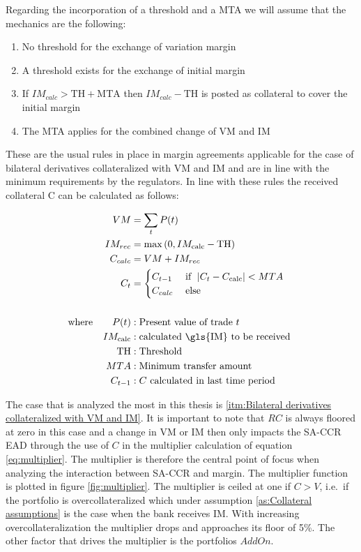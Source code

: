 \documentclass[../Thesis_AHoecherl.tex]{subfiles}
\begin{document}
Regarding the incorporation of a threshold and a MTA we will assume that the mechanics are the following:
\begin{enumerate}
	\item No threshold for the exchange of variation margin
	\item A threshold exists for the exchange of initial margin
	\item If $ IM_{calc} > \text{TH} + \text{MTA} $ then $IM_{calc} - \text{TH} $ is posted as collateral to cover the initial margin
	\item The MTA applies for the combined change of VM and IM
\end{enumerate}

These are the usual rules in place in margin agreements applicable for the case of bilateral derivatives collateralized with VM and IM and are in line with the minimum requirements by the regulators.
In line with these rules the received collateral C can be calculated as follows:

\begin{align*}
	VM &= \sum_t{P(t)} \\
	IM_{rec} &= \max{(0, IM_{\text{calc}}-\text{TH})}\\
	C_{calc} &= VM + IM_{rec}\\
	C_t &= \begin{cases}
		C_{t-1} & \text{if } \; |C_t-C_{\text{calc}}| < MTA\\
		C_{calc} \; &\text{else} 
	\end{cases}
	\\
	\\
	\text{where} \qquad P(t) &: \text{Present value of trade $t$} \\
	IM_{\text{calc}} &: \text{calculated \gls{IM} to be received } \\
	\text{TH} &: \text{Threshold} \\
	MTA &: \text{Minimum transfer amount} \\
	C_{t-1} &: \text{$C$ calculated in last time period}
\end{align*}

The case that is analyzed the most in this thesis is \ref{itm:Bilateral derivatives collateralized with VM and IM}. It is important to note that \(RC\) is always floored at zero in this case and a change in VM or IM then only impacts the \gls{SA-CCR} \gls{EAD} through the use of \(C\) in the multiplier calculation of equation \ref{eq:multiplier}. 
The multiplier is therefore the central point of focus when analyzing the interaction between SA-CCR and margin. The multiplier function is plotted in figure \ref{fig:multiplier}.
The multiplier is ceiled at one if \(C>V\), i.e.~if the portfolio is overcollateralized which under assumption \ref{as:Collateral assumptions} is the case when the bank receives \gls{IM}. With increasing overcollateralization the multiplier drops and approaches its floor of 5\%. The other factor that drives the multiplier is the portfolios \(AddOn\). 
\end{document}
